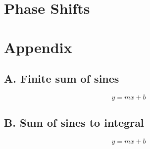 \documentclass[11pt]{article}
\begin{document}
\section*{Phase Shifts}
\label{sec:phase_shifts}

\section*{Appendix}

\subsection*{A. Finite sum of sines}
\label{subsec:sine_sum}

\renewcommand{\theequation}{A.\arabic{equation}}
\begin{equation}
y = mx+b
\end{equation}

\subsection*{B. Sum of sines to integral}
\label{subsec:sum_to_int}

\renewcommand{\theequation}{B.\arabic{equation}}
\begin{equation}
y = mx+b
\end{equation}
\end{document}
